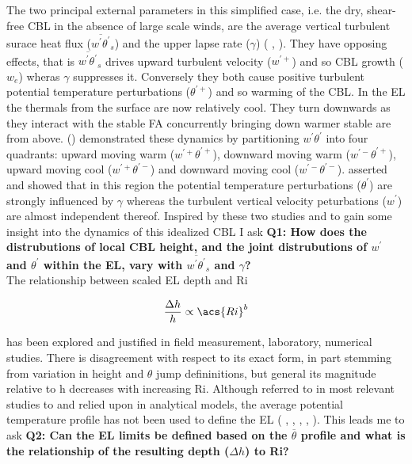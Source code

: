 The two principal external parameters in this simplified case, i.e. the dry, shear-free \acs{CBL} in the absence of large scale winds, are the average vertical turbulent surace heat flux ($\overline{w^{'}\theta^{'}}_{s}$) and the upper lapse rate ($\gamma$) (\citeauthor{FedConzMir04} \citeyear{FedConzMir04},\citeauthor{Sorbjan} \citeyear{Sorbjan}).  They have opposing effects, that is $\overline{w^{'}\theta^{'}}_{s}$ drives upward turbulent velocity ($w^{'+}$) and so \acs{CBL} growth ($w_{e}$) wheras $\gamma$  suppresses it.  Conversely they both cause positive turbulent potential temperature perturbations ($\theta^{'+}$) and so warming of the \acs{CBL}.  In the \acs{EL} the thermals from the surface are now relatively cool.  They turn downwards as they interact with the stable \acs{FA} concurrently bringing down warmer stable are from above.  \citeauthor{SullMoengStev} (\citeyear{SullMoengStev}) demonstrated these dynamics by partitioning $w^{'} \theta^{'}$ into four quadrants:  upward moving warm ($w^{'+} \theta^{'+}$), downward moving warm ($w^{'-} \theta^{'+}$), upward moving cool ($w^{'+} \theta^{'-}$) and downward moving cool ($w^{'-} \theta^{'-}$).  \citeauthor{Sorbjan} \citeyear{Sorbjan} asserted and showed that in this region the potential temperature perturbations ($\theta^{'}$) are strongly influenced by $\gamma$ whereas the turbulent vertical velocity peturbations ($w^{'}$) are almost independent thereof. Inspired by these two studies and to gain some insight into the dynamics of this idealized \acs{CBL} I ask \textbf{Q1: How does the distrubutions of local \acs{CBL} height, and the joint distrubutions of $w^{'}$ and $\theta^{'}$ within the \acs{EL}, vary with $\overline{w^{'}\theta^{'}}_{s}$ and $\gamma$?}\\

The relationship between scaled \acs{EL} depth and \acs{Ri} 

\begin{equation}
\frac{\Delta h}{h} \propto  \acs{Ri}^{b}
\end{equation}

has been explored and justified in field measurement, laboratory, numerical studies.  There is disagreement with respect to its exact form, in part stemming from variation in height and $\theta$ jump defininitions, but general its magnitude relative to h decreases with increasing \acs{Ri}. Although referred to in most relevant studies to and relied upon in analytical models, the average potential temperature profile has not been used to define the \acs{EL} (\citeauthor{DearWill80} \citeyear{DearWill80}, \citeauthor{StullNelEl} \citeyear{StullNelEl}, \citeauthor{FedConzMir04} \citeyear{FedConzMir04}, \citeauthor{Boers89} \citeyear{Boers89}, \citeauthor{BrooksFowler2} \citeyear{BrooksFowler2}). This leads me to ask \textbf{Q2: Can the \acs{EL} limits be defined based on the $\overline{\theta}$ profile and what is the relationship of the resulting depth ($\Delta h$) to \acs{Ri}?}\\


